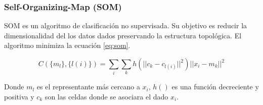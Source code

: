 \subsubsection{Self-Organizing-Map (SOM)}

SOM es un algoritmo de clasificación no supervisada. Su objetivo es reducir la dimensionalidad del los datos dados preservando la estructura topológica. El algoritmo minimiza la ecuación \ref{eq:som}.

\begin{equation}
    C(\{m_l\},\{l(i)\}) = \sum_i \sum_k h(||c_k-c_{l(i)}||^2) ||x_i-m_k||^2
    \label{eq:som}
\end{equation}

Donde $m_l$ es el representante más cercano a $x_i$, $h()$ es una función decreciente y positiva y $c_k$ son las celdas donde se asociara el dado $x_i$.